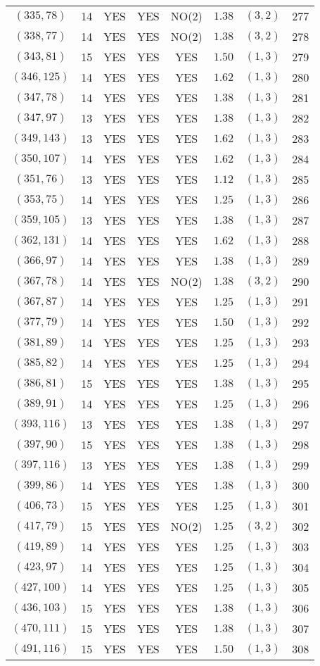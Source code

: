 \begin{longtable}{|c|c|c|c|c|c|c|c|}
$(335,78)$ & 14 & YES & YES & NO(2) & $1.38$ & $(3,2)$ & 277\\
$(338,77)$ & 14 & YES & YES & NO(2) & $1.38$ & $(3,2)$ & 278\\
$(343,81)$ & 15 & YES & YES & YES & $1.50$ & $(1,3)$ & 279\\
$(346,125)$ & 14 & YES & YES & YES & $1.62$ & $(1,3)$ & 280\\
$(347,78)$ & 14 & YES & YES & YES & $1.38$ & $(1,3)$ & 281\\
$(347,97)$ & 13 & YES & YES & YES & $1.38$ & $(1,3)$ & 282\\
$(349,143)$ & 13 & YES & YES & YES & $1.62$ & $(1,3)$ & 283\\
$(350,107)$ & 14 & YES & YES & YES & $1.62$ & $(1,3)$ & 284\\
$(351,76)$ & 13 & YES & YES & YES & $1.12$ & $(1,3)$ & 285\\
$(353,75)$ & 14 & YES & YES & YES & $1.25$ & $(1,3)$ & 286\\
$(359,105)$ & 13 & YES & YES & YES & $1.38$ & $(1,3)$ & 287\\
$(362,131)$ & 14 & YES & YES & YES & $1.62$ & $(1,3)$ & 288\\
$(366,97)$ & 14 & YES & YES & YES & $1.38$ & $(1,3)$ & 289\\
$(367,78)$ & 14 & YES & YES & NO(2) & $1.38$ & $(3,2)$ & 290\\
$(367,87)$ & 14 & YES & YES & YES & $1.25$ & $(1,3)$ & 291\\
$(377,79)$ & 14 & YES & YES & YES & $1.50$ & $(1,3)$ & 292\\
$(381,89)$ & 14 & YES & YES & YES & $1.25$ & $(1,3)$ & 293\\
$(385,82)$ & 14 & YES & YES & YES & $1.25$ & $(1,3)$ & 294\\
$(386,81)$ & 15 & YES & YES & YES & $1.38$ & $(1,3)$ & 295\\
$(389,91)$ & 14 & YES & YES & YES & $1.25$ & $(1,3)$ & 296\\
$(393,116)$ & 13 & YES & YES & YES & $1.38$ & $(1,3)$ & 297\\
$(397,90)$ & 15 & YES & YES & YES & $1.38$ & $(1,3)$ & 298\\
$(397,116)$ & 13 & YES & YES & YES & $1.38$ & $(1,3)$ & 299\\
$(399,86)$ & 14 & YES & YES & YES & $1.38$ & $(1,3)$ & 300\\
$(406,73)$ & 15 & YES & YES & YES & $1.25$ & $(1,3)$ & 301\\
$(417,79)$ & 15 & YES & YES & NO(2) & $1.25$ & $(3,2)$ & 302\\
$(419,89)$ & 14 & YES & YES & YES & $1.25$ & $(1,3)$ & 303\\
$(423,97)$ & 14 & YES & YES & YES & $1.25$ & $(1,3)$ & 304\\
$(427,100)$ & 14 & YES & YES & YES & $1.25$ & $(1,3)$ & 305\\
$(436,103)$ & 15 & YES & YES & YES & $1.38$ & $(1,3)$ & 306\\
$(470,111)$ & 15 & YES & YES & YES & $1.38$ & $(1,3)$ & 307\\
$(491,116)$ & 15 & YES & YES & YES & $1.50$ & $(1,3)$ & 308
\end{longtable}

